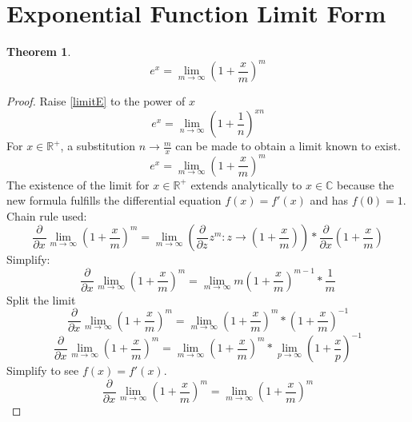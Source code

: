 \documentclass[]{article}
\newcommand{\pqty}[1]{{\left(#1\right)}}
\newcommand{\pdiff}[2]{\frac{\partial^{#2}}{\partial #1^{#2}}}
\newtheorem{theorem}{Theorem}[section]
\numberwithin{equation}{section}
\begin{document}
	\section{Exponential Function Limit Form}
	\begin{theorem}
		\begin{equation}
			\label{expLim2}
			e^x=\lim\limits_{m\to\infty}\pqty{1+\frac{x}{m}}^m
		\end{equation}
	\end{theorem}
	\begin{proof}
		Raise \eqref{limitE} to the power of \(x\)
		\begin{equation}
			e^x=\lim\limits_{n\to\infty}\pqty{1+\frac{1}{n}}^{xn}
		\end{equation}
		For \(x\in\mathbb{R}^+\), a substitution \(n\to \frac{m}{x}\) can be made to obtain a limit known to exist.
		\begin{equation}
			e^x=\lim\limits_{m\to\infty}\pqty{1+\frac{x}{m}}^m
		\end{equation}
		The existence of the limit for \(x\in\mathbb{R}^+\) extends analytically to \(x\in\mathbb{C}\) because the new formula fulfills the differential equation \(f(x)=f'(x)\) and has \(f(0)=1\).
		Chain rule used:
		\begin{equation}
		\pdiff{x}{}\lim\limits_{m\to\infty}\pqty{1+\frac{x}{m}}^m
		=
		\lim\limits_{m\to\infty}\pqty{\pdiff{z}{}z^m:z\to \pqty{1+\frac{x}{m}}}*\pdiff{x}{}\pqty{1+\frac{x}{m}}
		\end{equation}
		Simplify:
		\begin{equation}
		\pdiff{x}{}\lim\limits_{m\to\infty}\pqty{1+\frac{x}{m}}^m
		=
		\lim\limits_{m\to\infty}m\pqty{1+\frac{x}{m}}^{m-1}*\frac{1}{m}
		\end{equation}
		Split the limit
		\begin{equation}
		\pdiff{x}{}\lim\limits_{m\to\infty}\pqty{1+\frac{x}{m}}^m
		=
		\lim\limits_{m\to\infty}\pqty{1+\frac{x}{m}}^{m}*\pqty{1+\frac{x}{m}}^{-1}
		\end{equation}
		\begin{equation}
		\pdiff{x}{}\lim\limits_{m\to\infty}\pqty{1+\frac{x}{m}}^m
		=
		\lim\limits_{m\to\infty}\pqty{1+\frac{x}{m}}^{m}*
		\lim\limits_{p\to\infty}\pqty{1+\frac{x}{p}}^{-1}
		\end{equation}
		Simplify to see \(f(x)=f'(x)\).
		\begin{equation}
		\pdiff{x}{}\lim\limits_{m\to\infty}\pqty{1+\frac{x}{m}}^m
		=
		\lim\limits_{m\to\infty}\pqty{1+\frac{x}{m}}^{m}
		\end{equation}
	\end{proof}
	
\end{document}
